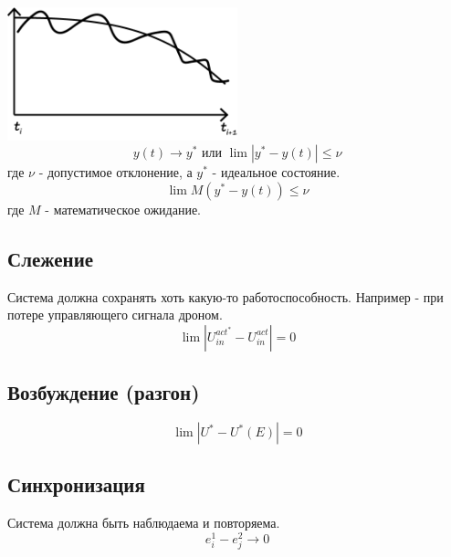 \documentclass[12pt]{article}
\begin{document}
\begin{sloppypar}
    \includegraphics[width=0.5\textwidth]{graphics/Стабилизация.png}
    \[
        y(t) \rightarrow y^* \text{ или } \lim{|y^* - y(t)|} \leq \nu
    \]
    где $\nu$ - допустимое отклонение, а $y^*$ - идеальное состояние.
    \[
        \lim{M(y^* - y(t))} \leq \nu
    \]
    где $M$ - математическое ожидание.

    \subsection{Слежение}
    Система должна сохранять хоть какую-то работоспособность.
    Например - при потере управляющего сигнала дроном.
    \[
        \lim |U_{in}^{{act}^*} - U_{in}^{act}| = 0
    \]

    \subsection{Возбуждение (разгон)}
    \[
        \lim |U^* - U^*(E)| = 0
    \]

    \subsection{Синхронизация}
    Система должна быть наблюдаема и повторяема.
    \[
        e_i^1 - e_j^2 \rightarrow 0
    \]


\end{sloppypar}
\end{document}
